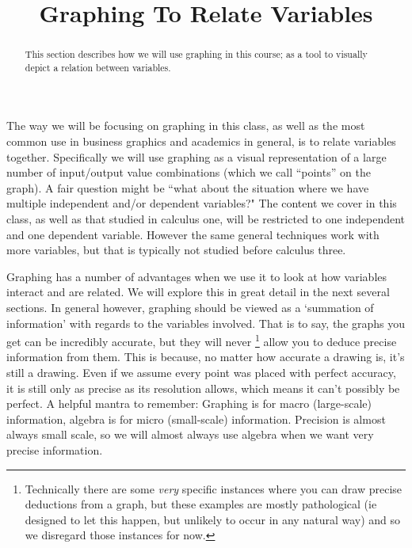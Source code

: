 \documentclass{ximeraXloud}
\title{Graphing To Relate Variables}
\begin{document}
\begin{abstract}
    This section describes how we will use graphing in this course; as a tool to visually depict a relation between variables.
\end{abstract}
\maketitle


The way we will be focusing on graphing in this class, as well as the most common use in business graphics and academics in general, is to relate variables together. Specifically we will use graphing as a visual representation of a large number of input/output value combinations (which we call ``points'' on the graph). A fair question might be ``what about the situation where we have multiple independent and/or dependent variables?" The content we cover in this class, as well as that studied in calculus one, will be restricted to one independent and one dependent variable. However the same general techniques work with more variables, but that is typically not studied before calculus three.

Graphing has a number of advantages when we use it to look at how variables interact and are related. We will explore this in great detail in the next several sections. In general however, graphing should be viewed as a `summation of information' with regards to the variables involved. That is to say, the graphs you get can be incredibly accurate, but they will never%
\footnote{
    Technically there are some \textit{very} specific instances where you can draw precise deductions from a graph, but these examples are mostly pathological (ie designed to let this happen, but unlikely to occur in any natural way) and so we disregard those instances for now.
    }%
allow you to deduce precise information from them. This is because, no matter how accurate a drawing is, it's still a drawing. Even if we assume every point was placed with perfect accuracy, it is still only as precise as its resolution allows, which means it can't possibly be perfect. A helpful mantra to remember: Graphing is for macro (large-scale) information, algebra is for micro (small-scale) information. Precision is almost always small scale, so we will almost always use algebra when we want very precise information.
\end{document}
